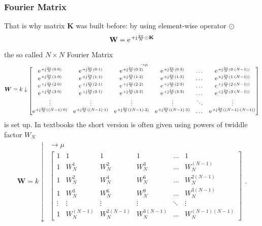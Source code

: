 \documentclass[11pt,a4paper,DIV=12]{scrartcl}
\begin{document}
\subsubsection{Fourier Matrix}
%
That is why matrix $\bm{K}$ was built before: by using element-wise operator $\odot$
%
\begin{equation}
\mathbf{W} =
\e^{+\im\frac{2\pi}{N} \odot \mathbf{K}}
\end{equation}
%
the so called
$N \times N$ Fourier Matrix
%
\begin{align}
\label{eq:FourierMatrix}
\bm{W} =
k \downarrow
\substack{\rightarrow \mu\\
\begin{bmatrix}
\e^{+\im\frac{2\pi}{N} (0 \cdot 0)} & \e^{+\im\frac{2\pi}{N} (0 \cdot 1)} & \e^{+\im\frac{2\pi}{N} (0 \cdot 2)} & \e^{+\im\frac{2\pi}{N} (0 \cdot 3)} & \dots & \e^{+\im\frac{2\pi}{N} (0 \cdot (N-1))}\\
\e^{+\im\frac{2\pi}{N} (1 \cdot 0)} & \e^{+\im\frac{2\pi}{N} (1 \cdot 1)} & \e^{+\im\frac{2\pi}{N} (1 \cdot 2)} & \e^{+\im\frac{2\pi}{N} (1 \cdot 3)} & \dots & \e^{+\im\frac{2\pi}{N} (1 \cdot (N-1))} \\
\e^{+\im\frac{2\pi}{N} (2 \cdot 0)} & \e^{+\im\frac{2\pi}{N} (2 \cdot 1)} & \e^{+\im\frac{2\pi}{N} (2 \cdot 2)} & \e^{+\im\frac{2\pi}{N} (2 \cdot 3)} & \dots & \e^{+\im\frac{2\pi}{N} (2 \cdot (N-1))}\\
\e^{+\im\frac{2\pi}{N} (3 \cdot 0)} & \e^{+\im\frac{2\pi}{N} (3 \cdot 1)} & \e^{+\im\frac{2\pi}{N} (3 \cdot 2)} & \e^{+\im\frac{2\pi}{N} (3 \cdot 3)} & \dots & \e^{+\im\frac{2\pi}{N} (3 \cdot (N-1))}\\
\vdots & \vdots & \vdots & \vdots & \ddots & \vdots\\
\e^{+\im\frac{2\pi}{N} ((N-1) \cdot 0)} & \e^{+\im\frac{2\pi}{N} ((N-1) \cdot 1)} & \e^{+\im\frac{2\pi}{N} ((N-1) \cdot 2)} & \e^{+\im\frac{2\pi}{N} ((N-1) \cdot 3)} & \dots &  \e^{+\im\frac{2\pi}{N} ((N-1) \cdot (N-1))}
\end{bmatrix}
}
\end{align}
is set up.
%
In textbooks the short version is often given using powers of twiddle factor $W_N$
\begin{align}
\bm{W} =
k \downarrow
\substack{\rightarrow \mu\\
\begin{bmatrix}
1 & 1 & 1 & 1 & \dots & 1\\[1em]
1 & W_N^1 & W_N^2 & W_N^3 & \dots & W_N^{(N-1)}\\[1em]
1 & W_N^2 & W_N^4 & W_N^6 & \dots & W_N^{2(N-1)}\\[1em]
1 & W_N^3 & W_N^6 & W_N^9 & \dots & W_N^{3(N-1)}\\[1em]
\vdots & \vdots & \vdots &\vdots &\ddots & \vdots\\[1em]
1 & W_N^{(N-1)} & W_N^{2(N-1)} & W_N^{3(N-1)} & \dots & W_N^{(N-1)(N-1)}
\end{bmatrix}
}.
\end{align}
\end{document}
